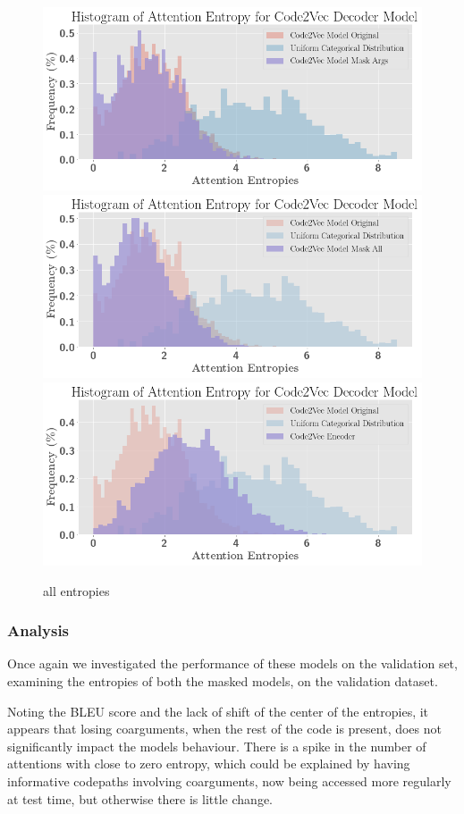 \begin{figure}
\begin{center}
\includegraphics[width=0.8\linewidth]{ImagesCodeRelated/entropies_mask_args.png} 
\includegraphics[width=0.8\linewidth]{ImagesCodeRelated/entropies_mask_all.png}
\includegraphics[width=0.8\linewidth]{ImagesCodeRelated/entropies_encoder.png}
\end{center}
\caption{all entropies}
\label{fig:all_entropies}
\end{figure}


\subsubsection{Analysis} %

Once again we investigated the performance of these models on the validation set, examining the entropies of both the masked models, on the validation dataset.

Noting the BLEU score and the lack of shift of the center of the entropies, it appears that losing coarguments, when the rest of the code is present, does not significantly impact the models behaviour.
There is a spike in the number of attentions with close to zero entropy, which could be explained by having informative codepaths involving coarguments, now being accessed more regularly at test time, but otherwise there is little change.

